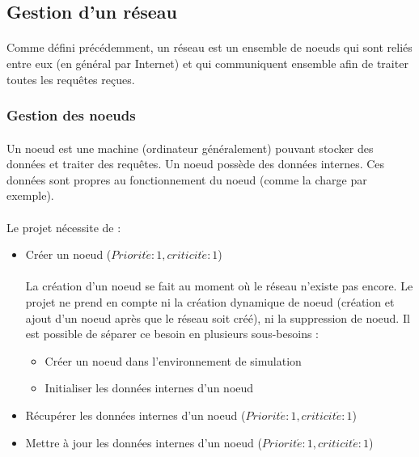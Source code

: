 \documentclass[12pt]{article}
\newcommand{\besoin}[2] {
  ($Priorit\acute{e} : #1, criticit\acute{e} : #2$)
}
\begin{document}
\subsection{Gestion d'un réseau}

\paragraph{} Comme défini précédemment, un réseau est un ensemble de noeuds qui sont reliés entre eux (en général par Internet) et qui communiquent ensemble afin de traiter toutes les requêtes reçues.

\subsubsection{Gestion des noeuds}

\paragraph{} Un noeud est une machine (ordinateur généralement) pouvant stocker des données et traiter des requêtes. Un noeud possède des données internes. Ces données sont propres au fonctionnement du noeud (comme la charge par exemple).

\paragraph{} Le projet nécessite de :
\begin{itemize}
 \item Créer un noeud \besoin{1}{1}
 \paragraph{} La création d'un noeud se fait au moment où le réseau n'existe pas encore. Le projet ne prend en compte ni la création dynamique de noeud (création et ajout d'un noeud après que le réseau soit créé), ni la suppression de noeud. Il est possible de séparer ce besoin en plusieurs sous-besoins :
 \begin{itemize}
 	\item Créer un noeud dans l'environnement de simulation
 	\item Initialiser les données internes d'un noeud
 \end{itemize}
 \item Récupérer les données internes d'un noeud \besoin{1}{1}
 \item Mettre à jour les données internes d'un noeud \besoin{1}{1}
\end{itemize}
\end{document}
